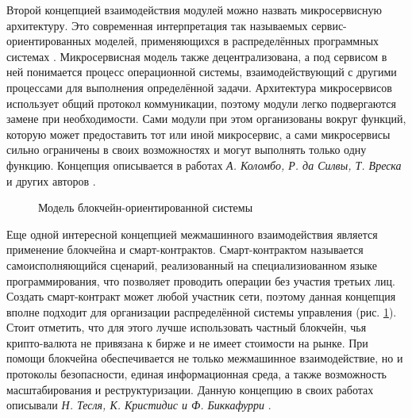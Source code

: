 Второй концепцией взаимодействия модулей можно назвать микросервисную архитектуру. Это современная интерпретация так называемых сервис-ориентированных моделей, применяющихся в распределённых программных системах \cite{Barry2014}. Микросервисная модель также децентрализована, а под сервисом в ней понимается процесс операционной системы, взаимодействующий с другими процессами для выполнения определённой задачи. Архитектура микросервисов использует общий протокол коммуникации, поэтому модули легко подвергаются замене при необходимости. Сами модули при этом организованы вокруг функций, которую может предоставить тот или иной микросервис, а сами микросервисы сильно ограничены в своих возможностях и могут выполнять только одну функцию. Концепция описывается в работах \textit{А. Коломбо, Р. да Силвы, Т. Вреска} и других авторов \cite{daSilva201687, Vresk7522321, Colombo201567}.

\begin{figure}[ht]
	\caption{Модель блокчейн-ориентированной системы}\label{fig:bc-system}
\end{figure}

Еще одной интересной концепцией межмашинного взаимодействия является применение блокчейна и смарт-контрактов. Смарт-контрактом называется самоисполняющийся сценарий, реализованный на специализиованном языке программирования, что позволяет проводить операции без участия третьих лиц. Создать смарт-контракт может любой участник сети, поэтому данная концепция вполне подходит для организации распределённой системы управления (рис. \cref{fig:bc-system}). Стоит отметить, что для этого лучше использовать частный блокчейн, чья крипто-валюта не привязана к бирже и не имеет стоимости на рынке. При помощи блокчейна обеспечивается не только межмашинное взаимодействие, но и протоколы безопасности, единая информационная среда, а также возможность масштабирования и реструктуризации. Данную концепцию в своих работах описывали \textit{Н. Тесля, К. Кристидис и Ф. Биккафурри} \cite{Teslya2017, 7467408, 3098954-3098983}.

